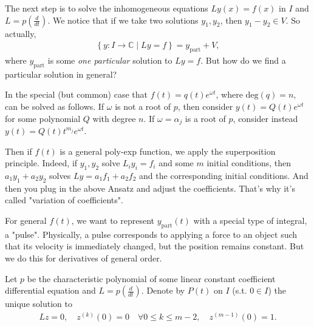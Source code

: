 The next step is to solve the inhomogeneous equations $Ly(x) = f(x)$ in $I$ and $L = p\left( \frac{d}{dt} \right) $. We notice that if we take two solutions $y_{1}, y_{2}$, then $y_{1} - y_{2} \in V$. So actually,
\begin{align*}
	\left\{ y: I \to \mathbb{C} \mid Ly = f \right\} = y_{\text{part}} + V,
\end{align*}
where $y_{\text{part}}$ is some \textit{one particular} solution to $Ly = f$. But how do we find a particular solution in general?

In the special (but common) case that $f(t) = q(t)e^{ \omega t }$, where $ \text{deg}(q) = n$, can be solved as follows. If $\omega$ is not a root of $p$, then consider $y(t) = Q(t) e^{ \omega t }$ for some polynomial $Q$ with degree $n$. If $\omega = \alpha_{j}$ is a root of $p$, consider instead $y(t) = Q(t)t^{m_{j}}e^{ \omega t }$.

Then if $f(t)$ is a general poly-exp function, we apply the superposition principle. Indeed, if $y_{1}, y_{2}$ solve $L_{i} y_{i} = f_{i}$ and some $m$ initial conditions, then $a_{1} y_{1} + a_{2} y_{2}$ solves $Ly = a_{1} f_{1} + a_{2} f_{2}$ and the corresponding initial conditions. And then you plug in the above Ansatz and adjust the coefficients. That's why it's called "variation of coefficients". 

For general $f(t)$, we want to represent $y_{\text{part}}(t)$ with a special type of integral, a "pulse". Physically, a pulse corresponds to applying a force to an object such that its velocity is immediately changed, but the position remains constant. But we do this for derivatives of general order.

\begin{definition}[Pulse]\label{def:pulse}
	Let $p$ be the characteristic polynomial of some linear constant coefficient differential equation and $L = p\left( \frac{d}{dt} \right)$. Denote by $P(t)$ on $I$ (s.t. $0 \in I$) the unique solution to
	\begin{align*}
		Lz = 0 , \quad
		z^{(k)}(0) = 0 \quad \forall 0 \leq k \leq m-2, \quad
		z^{(m-1)}(0) = 1. 
	\end{align*}
\end{definition}

